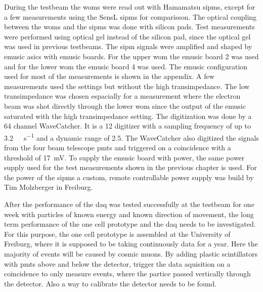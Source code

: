 During the testbeam the \acp{wom} were read out with Hamamatsu \acp{sipm}, except for a few measurements using the SensL \acp{sipm} for comparisson.
The optical coupling between the \acp{wom} and the \acp{sipm} was done with silicon pads.
Test measurements were performed using optical gel instead of the silicon pad, since the optical gel was used in previous testbeams.
The \ac{sipm} signals were amplified and shaped by \ac{emusic} \acp{asic} with \ac{emusic} boards.
For the upper \ac{wom} the \ac{emusic} board 2 was used and for the lower \ac{wom} the \ac{emusic} board 4 was used.
The \ac{emusic} configuration used for most of the measurements is shown in the appendix.
A few measurements used the settings but without the high transimpedance.
The low transimpedance was chosen espacially for a measurement where the electron beam was shot directly through the lower \ac{wom} since the output of the \ac{emusic} saturated with the high transimpedance setting.
The digitization was done by a 64 channel WaveCatcher.
It is a \SI{12}{\bit} digitizer with a sampling frequency of up to \SI{3.2}{\giga\sample\per\second} and a dynamic range of \SI{2.5}{\voltpp}.
The WaveCatcher also digitized the signals from the four beam telescope \acp{pmt} and triggered on a coincidence with a threshold of \SI{17}{\milli\volt}.
To supply the \ac{emusic} board with power, the same power supply used for the test measurements shown in the previous chapter is used.
For the power of the \acp{sipm} a custom, remote controllable power supply was build by Tim Molzberger in Freiburg.






After the performance of the \ac{daq} was tested successfully at the testbeam for one week with particles of known energy and known direction of movement, the long term performance of the one cell prototype and the \ac{daq} needs to be investigated.
For this purpose, the one cell prototype is assembled at the University of Freiburg, where it is supposed to be taking continuously data for a year.
Here the majority of events will be caused by cosmic muons.
By adding plastic scintillators with \acp{pmt} above and below the detector, trigger the data aquisition on a coincidence to only measure events, where the partice passed vertically through the detector.
Also a way to calibrate the detector needs to be found.
